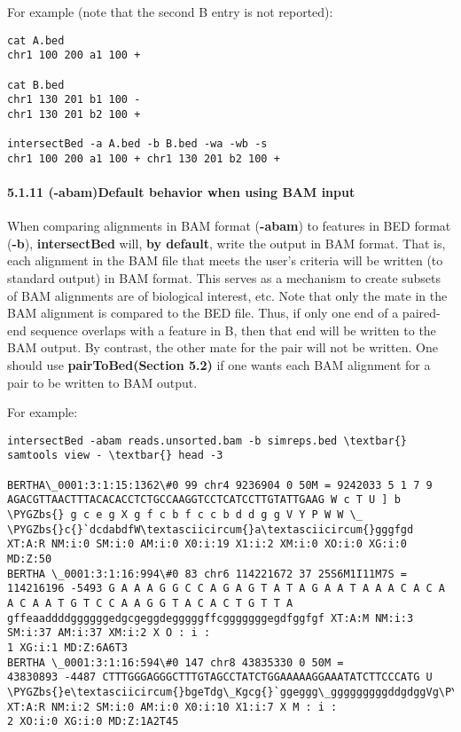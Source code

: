 \documentclass[letterpaper,10pt,english]{sphinxmanual}
\def\PYGZbs{\char`\\}
\begin{document}
For example (note that the second B entry is not reported):

\begin{Verbatim}[commandchars=\\\{\}]
cat A.bed
chr1 100 200 a1 100 +

cat B.bed
chr1 130 201 b1 100 -
chr1 130 201 b2 100 +

intersectBed -a A.bed -b B.bed -wa -wb -s
chr1 100 200 a1 100 + chr1 130 201 b2 100 +
\end{Verbatim}


\paragraph{5.1.11 (-abam)Default behavior when using BAM input}
\label{content/intersectBed:abam-default-behavior-when-using-bam-input}
When comparing alignments in BAM format (\textbf{-abam}) to features in BED format (\textbf{-b}), \textbf{intersectBed}
will, \textbf{by default}, write the output in BAM format. That is, each alignment in the BAM file that meets
the user's criteria will be written (to standard output) in BAM format. This serves as a mechanism to
create subsets of BAM alignments are of biological interest, etc. Note that only the mate in the BAM
alignment is compared to the BED file. Thus, if only one end of a paired-end sequence overlaps with a
feature in B, then that end will be written to the BAM output. By contrast, the other mate for the
pair will not be written. One should use \textbf{pairToBed(Section 5.2)} if one wants each BAM alignment
for a pair to be written to BAM output.

For example:

\begin{Verbatim}[commandchars=\\\{\}]
intersectBed -abam reads.unsorted.bam -b simreps.bed \textbar{} samtools view - \textbar{} head -3

BERTHA\_0001:3:1:15:1362\#0 99 chr4 9236904 0 50M = 9242033 5 1 7 9
AGACGTTAACTTTACACACCTCTGCCAAGGTCCTCATCCTTGTATTGAAG W c T U ] b \PYGZbs{} g c e g X g f c b f c c b d d g g V Y P W W \_
\PYGZbs{}c{}`dcdabdfW\textasciicircum{}a\textasciicircum{}gggfgd XT:A:R NM:i:0 SM:i:0 AM:i:0 X0:i:19 X1:i:2 XM:i:0 XO:i:0 XG:i:0 MD:Z:50
BERTHA \_0001:3:1:16:994\#0 83 chr6 114221672 37 25S6M1I11M7S =
114216196 -5493 G A A A G G C C A G A G T A T A G A A T A A A C A C A A C A A T G T C C A A G G T A C A C T G T T A
gffeaaddddggggggedgcgeggdegggggffcgggggggegdfggfgf XT:A:M NM:i:3 SM:i:37 AM:i:37 XM:i:2 X O : i :
1 XG:i:1 MD:Z:6A6T3
BERTHA \_0001:3:1:16:594\#0 147 chr8 43835330 0 50M =
43830893 -4487 CTTTGGGAGGGCTTTGTAGCCTATCTGGAAAAAGGAAATATCTTCCCATG U
\PYGZbs{}e\textasciicircum{}bgeTdg\_Kgcg{}`ggeggg\_gggggggggddgdggVg\PYGZbs{}gWdfgfgff XT:A:R NM:i:2 SM:i:0 AM:i:0 X0:i:10 X1:i:7 X M : i :
2 XO:i:0 XG:i:0 MD:Z:1A2T45
\end{Verbatim}
\end{document}
